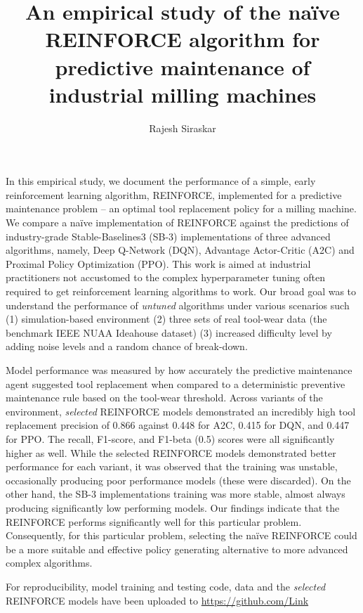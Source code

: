 \documentclass[a4paper, 12pt]{article}
\title{An empirical study of the na\"ive REINFORCE algorithm for predictive maintenance of industrial milling machines}
\author{Rajesh Siraskar}
\renewenvironment{abstract}
{\small
	\begin{center}
		\bfseries \abstractname\vspace{-.5em}\vspace{0pt}
	\end{center}
	\list{}{
		\setlength{\leftmargin}{.25cm}%
		\setlength{\rightmargin}{\leftmargin}%
	}%
	\item\relax}
{\endlist}
\begin{document}
\maketitle

\begin{abstract}
In this empirical study, we document the performance of a simple, early reinforcement learning algorithm, REINFORCE, implemented for a predictive maintenance problem -- an optimal tool replacement policy for a milling machine. We compare a na\"ive implementation of REINFORCE against the predictions of industry-grade Stable-Baselines3 (SB-3) implementations of three advanced algorithms, namely, Deep Q-Network (DQN), Advantage Actor-Critic (A2C) and Proximal Policy Optimization (PPO). This work is aimed at industrial practitioners not accustomed to the complex hyperparameter tuning often required to get reinforcement learning algorithms to work. Our broad goal was to understand the performance of \textit{untuned} algorithms under various scenarios such (1) simulation-based environment (2) three sets of real tool-wear data (the benchmark IEEE NUAA Ideahouse dataset) (3) increased difficulty level by adding noise levels and a random chance of break-down. 

Model performance was measured by how accurately the predictive maintenance agent suggested tool replacement when compared to a deterministic preventive maintenance rule based on the tool-wear threshold. Across variants of the environment, \textit{selected} REINFORCE models demonstrated an incredibly high tool replacement precision of 0.866 against 0.448 for A2C, 0.415 for DQN, and 0.447 for PPO. The recall, F1-score, and F1-beta (0.5) scores were all significantly higher as well. While the selected REINFORCE models demonstrated better performance for each variant, it was observed that the training was unstable, occasionally producing poor performance models (these were discarded). On the other hand, the SB-3 implementations training was more stable, almost always producing significantly low performing models. Our findings indicate that the REINFORCE performs significantly well for this particular problem. Consequently, for this particular problem, selecting the na\"ive REINFORCE could be a more suitable and effective policy generating alternative to more advanced complex algorithms. 

For reproducibility, model training and testing code, data and the \textit{selected} REINFORCE models have been uploaded to \href{https://github.com/Rajesh-Siraskar/Empirical-Study\_REINFORCE-for-predictive-maintenance}{https://github.com/Link} 
\end{abstract}
\end{document}
